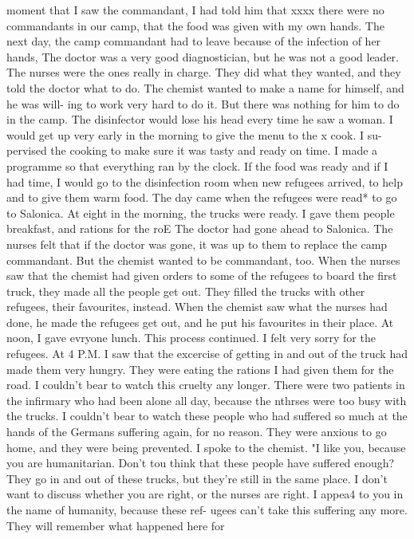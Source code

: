 moment that I saw the commandant, I had told him that xxxx there were no commandants 
in our camp, that the food was given with my own hands. 
The next day, the camp commandant had to leave because of the infection of her 
hands, The doctor was a very good diagnostician, but he was not a good leader. 
The nurses were the ones really in charge. They did what they wanted, and they told 
the doctor what to do. The chemist wanted to make a name for himself, and he was will-
ing to work very hard to do it. But there was nothing for him to do in the camp. The 
disinfector would lose his head every time he saw a woman. 
I would get up very early in the morning to give the menu to the x cook. I su-
pervised the cooking to make sure it was tasty and ready on time. I made a programme 
so that everything ran by the clock. If the food was ready and if I had time, I would 
go to the disinfection room when new refugees arrived, to help and to give them warm 
food. 
The day came when the refugees were read* to go to Salonica. At eight in the 
morning, the trucks were ready. I gave them people breakfast, and rations for the roE 
The doctor had gone ahead to Salonica. The nurses felt that if the doctor was gone, 
it was up to them to replace the camp commandant. But the chemist wanted to be 
commandant, too. When the nurses saw that the chemist had given orders to some of 
the refugees to board the first truck, they made all the people get out. They filled 
the trucks with other refugees, their favourites, instead. When the chemist saw 
what the nurses had done, he made the refugees get out, and he put his favourites in 
their place. At noon, I gave evryone lunch. 
This process continued. I felt very sorry for the refugees. At 4 P.M. I saw 
that the excercise of getting in and out of the truck had made them very hungry. 
They were eating the rations I had given them for the road. I couldn't bear to watch 
this cruelty any longer. There were two patients in the infirmary who had been alone 
all day, because the nthrses were too busy with the trucks. I couldn't bear to watch 
these people who had suffered so much at the hands of the Germans suffering again, 
for no reason. They were anxious to go home, and they were being prevented. 
I spoke to the chemist. "I like you, because you are humanitarian. Don't tou 
think that these people have suffered enough? They go in and out of these trucks, 
but they're still in the same place. I don't want to discuss whether you are right, 
or the nurses are right. I appea4 to you in the name of humanity, because these ref-
ugees can't take this suffering any more. They will remember what happened here for 
